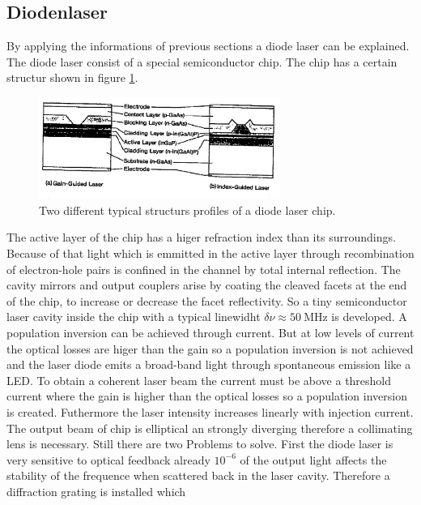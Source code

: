 \subsection{Diodenlaser}
\label{subsec:diodenlaser}
By applying the informations of previous sections
a diode laser can be explained.
The diode laser consist of a special semiconductor chip.
The chip has a certain structur shown in figure \ref{fig:chip}.
\begin{figure}
  \centering
  \includegraphics[width=0.7\textwidth]{chip.png}
  \caption{Two different typical structurs profiles of a diode laser chip.\cite{V61}}
  \label{fig:chip}
\end{figure}
The active layer of the chip has a higer refraction index than
its surroundings. Because of that light which is emmitted
in the active layer through recombination of electron-hole pairs
is confined in the channel by total internal reflection.
The cavity mirrors and output couplers arise
by coating the cleaved facets at the end of the chip,
to increase or decrease the facet reflectivity.
So a tiny semiconductor laser cavity inside the chip
with a typical linewidht
$\delta \nu \approx \SI{50}{\mega\hertz}$
is developed.
A population inversion
can be achieved through current.
But at low levels of current
the optical losses are higer than the gain
so a population inversion is not achieved and
the laser diode emits a broad-band light
through spontaneous emission
like a LED.
To obtain a coherent laser beam the current must be above
a threshold current where the gain is higher than the
optical losses so a population inversion is created.
Futhermore the laser intensity increases linearly with
injection current.
The output beam of chip is elliptical an strongly diverging
therefore a collimating lens is necessary.
Still there are two Problems to solve.
First the diode laser is very sensitive to optical feedback
already $10^{-6}$ of the output light affects
the stability of the frequence
when scattered back in the
laser cavity.
Therefore a diffraction grating is installed which
